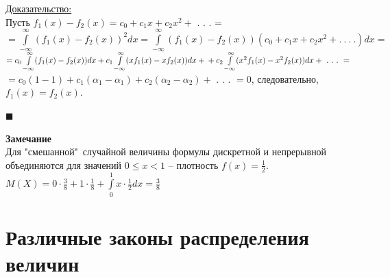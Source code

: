 \documentclass[russian, 12pt, fleqn,x11names]{article}
\begin{document}
\underline{Доказательство:}\\
Пусть $f_1(x) - f_2(x)= c_0 + c_1x + c_2x^2 +$ . . . =\\
$=\int\limits_{-\infty}^{\infty} (f_1(x) - f_2(x))^2dx = \int\limits_{-\infty}^{\infty} (f_1(x) - f_2(x))(c_0 + c_1x + c_2x^2 + .\ .\ .\ .)dx=$\\
$=c_0\int\limits_{-\infty}^{\infty}(f_1(x)-f_2(x))dx + c_1\int\limits_{-\infty}^{\infty}(xf_1(x) - xf_2(x))dx +\\ +   c_2\int\limits_{-\infty}^{\infty}(x^2f_1(x) - x^2f_2(x))dx  + \ . \ .\ .\ = $\\
$=c_0(1 - 1) + c_1(\alpha_1-\alpha_1) + c_2(\alpha_2 - \alpha_2) + $ . . . $=0$, следовательно, $f_1(x) = f_2(x)$.
\begin{flushright}\(\blacksquare\)\end{flushright}
\textbf{Замечание\ } \\ 
Для "смешанной"\  случайной величины формулы дискретной и непрерывной объединяются для значений $0\leq x< 1$ -- плотность $f(x) = \frac{1}{2}$.\\
$M(X) = 0\cdot \frac{3}{8} + 1\cdot \frac{1}{8} + \int\limits_{0}^{1}x\cdot \frac{1}{2} dx = \frac{3}{8}$
\section{Различные законы распределения величин}
\end{document}
